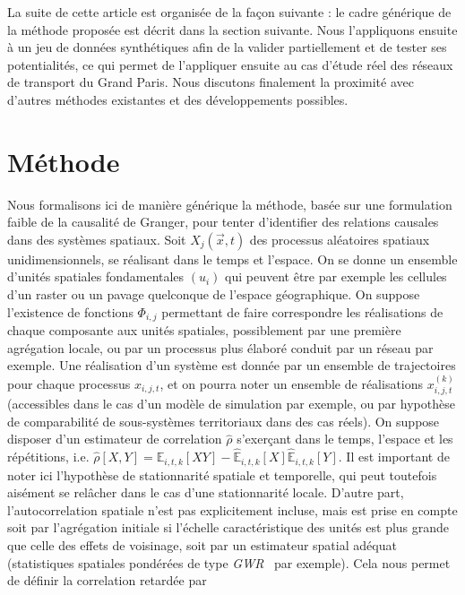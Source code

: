 \documentclass[french]{./sageo}
\begin{document}
La suite de cette article est organisée de la façon suivante : le cadre générique de la méthode proposée est décrit dans la section suivante. Nous l'appliquons ensuite à un jeu de données synthétiques afin de la valider partiellement et de tester ses potentialités, ce qui permet de l'appliquer ensuite au cas d'étude réel des réseaux de transport du Grand Paris. Nous discutons finalement la proximité avec d'autres méthodes existantes et des développements possibles.



\section{Méthode}



Nous formalisons ici de manière générique la méthode, basée sur une formulation faible  de la causalité de Granger, pour tenter d'identifier des relations causales dans des systèmes spatiaux. Soit $X_j(\vec{x},t)$ des processus aléatoires spatiaux unidimensionnels, se réalisant dans le temps et l'espace. On se donne un ensemble d'unités spatiales fondamentales $(u_i)$ qui peuvent être par exemple les cellules d'un raster ou un pavage quelconque de l'espace géographique. On suppose l'existence de fonctions $\Phi_{i,j}$ permettant de faire correspondre les réalisations de chaque composante aux unités spatiales, possiblement par une première agrégation locale, ou par un processus plus élaboré conduit par un réseau par exemple. Une réalisation d'un système est donnée par un ensemble de trajectoires pour chaque processus $x_{i,j,t}$, et on pourra noter un ensemble de réalisations $x^{(k)}_{i,j,t}$ (accessibles dans le cas d'un modèle de simulation par exemple, ou par hypothèse de comparabilité de sous-systèmes territoriaux dans des cas réels). On suppose disposer d'un estimateur de correlation $\hat{\rho}$ s'exerçant dans le temps, l'espace et les répétitions, i.e. $\hat{\rho}\left[X,Y\right] = \hat{\mathbb{E}}_{i,t,k}\left[XY\right] - \hat{\mathbb{E}}_{i,t,k}\left[X\right]\hat{\mathbb{E}}_{i,t,k}\left[Y\right]$. Il est important de noter ici l'hypothèse de stationnarité spatiale et temporelle, qui peut toutefois aisément se relâcher dans le cas d'une stationnarité locale. D'autre part, l'autocorrelation spatiale n'est pas explicitement incluse, mais est prise en compte soit par l'agrégation initiale si l'échelle caractéristique des unités est plus grande que celle des effets de voisinage, soit par un estimateur spatial adéquat (statistiques spatiales pondérées de type \emph{GWR}~\cite{brunsdon1998geographically} par exemple). Cela nous permet de définir la correlation retardée par
\end{document}
